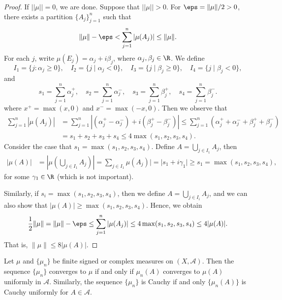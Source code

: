\begin{proof}
If $||\mu||=0$, we are done. Suppose that $||\mu||>0$. For $\eps=\|\mu\|/2>0$, there exists a partition $\{A_j\}_{j=1}^{n}$ such that 
\[\|\mu\|-\eps<\sum_{j=1}^{n}|\mu(A_{j})|\leq\|\mu\|.\]
For each $j$, write $\mu(E_{j})=\alpha_{j}+i\beta_{j}$, where $\alpha_{j},\beta_{j}\in\R$. We define
\[I_{1}=\{j:\alpha_{j}\geq0\},\quad I_{2}=\{j\mid\alpha_{j}<0\},\quad I_{3}=\{j\mid\beta_{j}\geq0\},\quad I_{4}=\{j\mid\beta_{j}<0\},\]
and
\[s_{1}=\sum_{j=1}^{n}\alpha_{j}^{+},\quad s_{2}=\sum_{j=1}^{n}\alpha_{j}^{-},\quad s_{3}=\sum_{j=1}^{n}\beta_{j}^{+},\quad s_{4}=\sum_{j=1}^{n}\beta_{j}^{-}.\]
where $x^+=\max(x,0)$ and $x^-=\max(-x,0)$. Then we observe that
\begin{align*}
\sum_{j=1}^{n}|\mu(A_{j})|&=\sum_{j=1}^{n}|(\alpha_{j}^{+}-\alpha_{j}^{-})+i(\beta_{j}^{+}-\beta_{j}^{-})|\leq\sum_{j=1}^{n}(\alpha_{j}^{+}+\alpha_{j}^{-}+\beta_{j}^{+}+\beta_{j}^{-})\\
&=s_{1}+s_{2}+s_{3}+s_{4}\leq 4\max(s_{1},s_{2},s_{3},s_{4}).
\end{align*}
Consider the case that $s_{1}=\max(s_{1},s_{2},s_{3},s_{4})$. Define
$A=\bigcup_{j\in I_{1}}A_{j}$, then
\begin{align*}
|\mu(A)|&=|\mu(\bigcup_{j\in I_1}A_j)|=\sum_{j\in I_{1}}\mu(A_{j})|=|s_{1}+i\gamma_{1}|\geq s_{1}=\max(s_{1},s_{2},s_{3},s_{4}),
\end{align*}
for some $\gamma_{1}\in\R$ (which is not important).\par
Similarly, if $s_i=\max(s_{1},s_{2},s_{3},s_{4})$,  then we define $A=\bigcup_{j\in I_{i}}A_{j}$, and we can also show that $|\mu(A)|\geq\max(s_1,s_2,s_3,s_4)$. Hence, we obtain
\begin{align*}
\frac{1}{2}\|\mu\|=\|\mu\|-\eps\leq\sum_{j=1}^{n}|\mu(A_j)|\leq 4\max(s_1,s_2,s_3,s_4)\leq 4|\mu(A)|.
\end{align*}
That is, $\|\mu\|\leq 8|\mu(A)|$.
\end{proof}
\begin{proposition}\label{space of measure converge iff uniform}
Let $\mu$ and $\{\mu_n\}$ be finite signed or complex measures on $(X,\mathcal{A})$. Then the sequence $\{\mu_n\}$ converges to $\mu$ if and only if $\mu_n(A)$ converges to $\mu(A)$ uniformly in $\mathcal{A}$. Similarly, the sequence $\{\mu_n\}$ is Cauchy if and only $\{\mu_n(A)\}$ is Cauchy uniformly for $A\in\mathcal{A}$.
\end{proposition}
